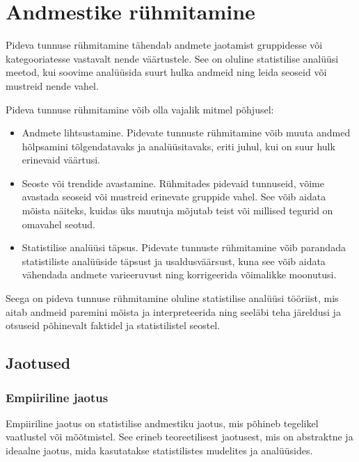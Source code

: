 \documentclass[
]{book}
\begin{document}
\chapter{Andmestike rühmitamine}\label{andmestike-ruxfchmitamine}

Pideva tunnuse rühmitamine tähendab andmete jaotamist gruppidesse või kategooriatesse vastavalt nende väärtustele. See on oluline statistilise analüüsi meetod, kui soovime analüüsida suurt hulka andmeid ning leida seoseid või mustreid nende vahel.

Pideva tunnuse rühmitamine võib olla vajalik mitmel põhjusel:

\begin{itemize}
\item
  Andmete lihtsustamine. Pidevate tunnuste rühmitamine võib muuta andmed hõlpsamini tõlgendatavaks ja analüüsitavaks, eriti juhul, kui on suur hulk erinevaid väärtusi.
\item
  Seoste või trendide avastamine. Rühmitades pidevaid tunnuseid, võime avastada seoseid või mustreid erinevate gruppide vahel. See võib aidata mõista näiteks, kuidas üks muutuja mõjutab teist või millised tegurid on omavahel seotud.
\item
  Statistilise analüüsi täpsus. Pidevate tunnuste rühmitamine võib parandada statistiliste analüüside täpsust ja usaldusväärsust, kuna see võib aidata vähendada andmete varieeruvust ning korrigeerida võimalikke moonutusi.
\end{itemize}

Seega on pideva tunnuse rühmitamine oluline statistilise analüüsi tööriist, mis aitab andmeid paremini mõista ja interpreteerida ning seeläbi teha järeldusi ja otsuseid põhinevalt faktidel ja statistilistel seostel.

\section{Jaotused}\label{jaotused}

\subsection{Empiiriline jaotus}\label{empiiriline-jaotus}

Empiiriline jaotus on statistilise andmestiku jaotus, mis põhineb tegelikel vaatlustel või mõõtmistel. See erineb teoreetilisest jaotusest, mis on abstraktne ja ideaalne jaotus, mida kasutatakse statistilistes mudelites ja analüüsides.
\end{document}
